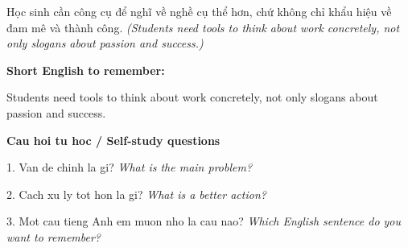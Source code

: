 \begin{baihoc}
Học sinh cần công cụ để nghĩ về nghề cụ thể hơn, chứ không chỉ khẩu hiệu về đam mê và thành công.
\textit{(Students need tools to think about work concretely, not only slogans about passion and success.)}
\end{baihoc}

\begin{ghinhoanh}
\textbf{Short English to remember:}

Students need tools to think about work concretely, not only slogans about passion and success.

\end{ghinhoanh}

\begin{tuhocnhanh}
\textbf{Cau hoi tu hoc / Self-study questions}

1. Van de chinh la gi? \textit{What is the main problem?}

2. Cach xu ly tot hon la gi? \textit{What is a better action?}

3. Mot cau tieng Anh em muon nho la cau nao? \textit{Which English sentence do you want to remember?}
\end{tuhocnhanh}
